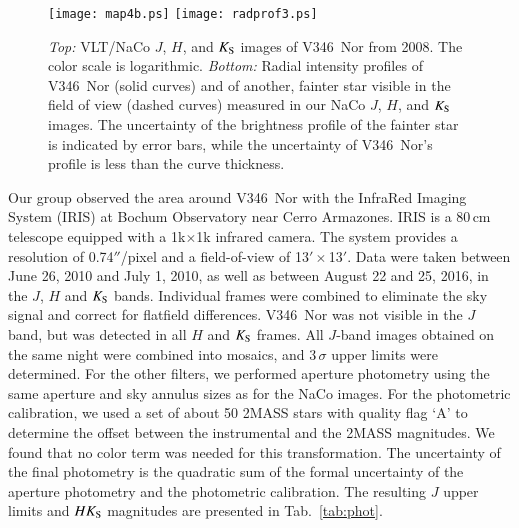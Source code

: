 \documentclass{aa}
\begin{document}
\begin{figure}
\centering \texttt{[image: map4b.ps]}
\centering \texttt{[image: radprof3.ps]}
\caption{{\it Top:} VLT/NaCo $J$, $H$, and $K_{\rm S}$ images of
  V346~Nor from 2008. The color scale is logarithmic. {\it Bottom:}
  Radial intensity profiles of V346~Nor (solid curves) and of another,
  fainter star visible in the field of view (dashed curves) measured
  in our NaCo $J$, $H$, and $K_{\rm S}$ images.  The uncertainty of
  the brightness profile of the fainter star is indicated by error
  bars, while the uncertainty of V346~Nor's profile is less than the
  curve thickness.}
\label{fig:naco}
\end{figure}

Our group observed the area around V346~Nor with the InfraRed Imaging
System (IRIS) at Bochum Observatory near Cerro Armazones. IRIS is a
80\,cm telescope equipped with a 1k$\times$1k infrared camera. The
system provides a resolution of 0.74$''$/pixel and a field-of-view of
13$'{\times}$13$'$. Data were taken between June 26, 2010 and July 1,
2010, as well as between August 22 and 25, 2016, in the $J$, $H$ and
$K_{\rm S}$ bands. Individual frames were combined to eliminate the
sky signal and correct for flatfield differences. V346~Nor was not
visible in the $J$ band, but was detected in all $H$ and $K_{\rm S}$
frames. All $J$-band images obtained on the same night were combined
into mosaics, and 3\,$\sigma$ upper limits were determined. For the
other filters, we performed aperture photometry using the same
aperture and sky annulus sizes as for the NaCo images. For the
photometric calibration, we used a set of about 50 2MASS stars with
quality flag `A' to determine the offset between the instrumental and
the 2MASS magnitudes. We found that no color term was needed for this
transformation. The uncertainty of the final photometry is the
quadratic sum of the formal uncertainty of the aperture photometry and
the photometric calibration. The resulting $J$ upper limits and
$HK_{\rm S}$ magnitudes are presented in Tab.~\ref{tab:phot}.
\end{document}
